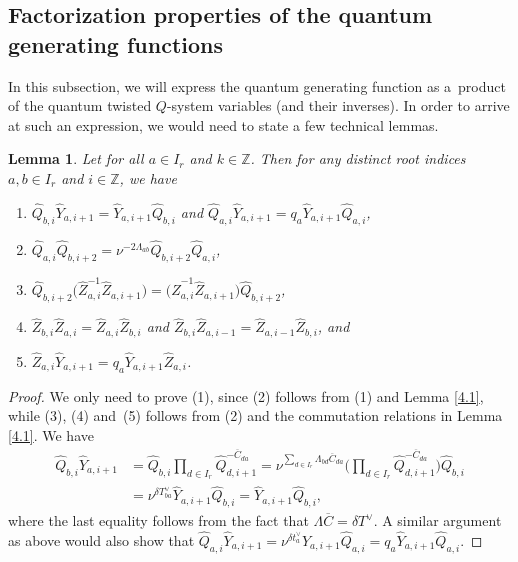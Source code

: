 \documentclass[10pt,a4paper]{amsart}
\numberwithin{equation}{section}
\newtheorem{Lemma}[Theorem]{Lemma}
\begin{document}
\subsection{Factorization properties of the quantum generating functions}\label{Section 4.3}

In this subsection, we will express the quantum generating function  as a~product of the quantum twisted $Q$-system variables (and their inverses). In order to arrive at such an expression, we would need to state a few technical lemmas.

\begin{Lemma}\label{4.5}
Let  for all $a\in I_r$ and $k\in\mathbb{Z}$. Then for any distinct root indices $a,b\in I_r$ and $i\in\mathbb{Z}$, we have
\begin{enumerate}\itemsep=0pt
\item[$(1)$] $\widehat{Q}_{b,i}\widehat{Y}_{a,i+1}=\widehat{Y}_{a,i+1}\widehat{Q}_{b,i}$ and $\widehat{Q}_{a,i}\widehat{Y}_{a,i+1}=q_a\widehat{Y}_{a,i+1}\widehat{Q}_{a,i}$,
\item[$(2)$] $\widehat{Q}_{a,i}\widehat{Q}_{b,i+2}=\nu^{-2\Lambda_{ab}}\widehat{Q}_{b,i+2}\widehat{Q}_{a,i}$,
\item[$(3)$] $\widehat{Q}_{b,i+2}\bigl(\widehat{Z}_{a,i}^{-1}\widehat{Z}_{a,i+1}\bigr)=\bigl(\widehat{Z}_{a,i}^{-1}\widehat{Z}_{a,i+1}\bigr)\widehat{Q}_{b,i+2}$,
\item[$(4)$] $\widehat{Z}_{b,i}\widehat{Z}_{a,i}=\widehat{Z}_{a,i}\widehat{Z}_{b,i}$ and $\widehat{Z}_{b,i}\widehat{Z}_{a,i-1}=\widehat{Z}_{a,i-1}\widehat{Z}_{b,i}$, and
\item[$(5)$] $\widehat{Z}_{a,i}\widehat{Y}_{a,i+1}=q_a\widehat{Y}_{a,i+1}\widehat{Z}_{a,i}$.
\end{enumerate}
\end{Lemma}

\begin{proof}
We only need to prove (1), since (2) follows from (1) and Lemma \ref{4.1}, while (3), (4) and~(5) follows from (2) and the commutation relations in Lemma \ref{4.1}. We have
\begin{align*}
\widehat{Q}_{b,i}\widehat{Y}_{a,i+1}
&=\widehat{Q}_{b,i}\prod_{d\in I_r}\widehat{Q}_{d,i+1}^{-\overline{C}_{da}}=\nu^{\sum_{d\in I_r}\Lambda_{bd}\overline{C}_{da}}\biggl(\prod_{d\in I_r}\widehat{Q}_{d,i+1}^{-\overline{C}_{da}}\biggr)\widehat{Q}_{b,i}\\
&=\nu^{\delta T_{ba}^{\vee}}\widehat{Y}_{a,i+1}\widehat{Q}_{b,i}=\widehat{Y}_{a,i+1}\widehat{Q}_{b,i},
\end{align*}
where the last equality follows from the fact that $\Lambda\overline{C}=\delta T^{\vee}$. A similar argument as above would also show that $\widehat{Q}_{a,i}\widehat{Y}_{a,i+1}=\nu^{\delta t_a^{\vee}}\widehat{Y}_{a,i+1}\widehat{Q}_{a,i}=q_a\widehat{Y}_{a,i+1}\widehat{Q}_{a,i}$.
\end{proof}
\end{document}
